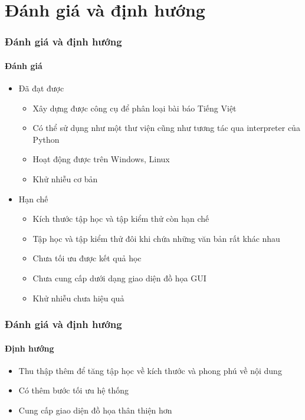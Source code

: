
\section{Đánh giá và định hướng}

\begin{frame}
  \frametitle{Đánh giá và định hướng}
  \framesubtitle{Đánh giá}
  \begin{itemize}[<+->]
    \item Đã đạt được
      \begin{itemize}
        \item Xây dựng được công cụ để phân loại bài báo Tiếng Việt
        \item Có thể sử dụng như một thư viện cũng như tương tác qua interpreter của Python
        \item Hoạt động được trên Windows, Linux
        \item Khử nhiễu cơ bản
      \end{itemize}
    \item Hạn chế
      \begin{itemize}
        \item Kích thước tập học và tập kiểm thử còn hạn chế
        \item Tập học và tập kiểm thử đôi khi chứa những văn bản rất khác nhau
        \item Chưa tối ưu được kết quả học
        \item Chưa cung cấp dưới dạng giao diện đồ họa GUI
        \item Khử nhiễu chưa hiệu quả
      \end{itemize}
  \end{itemize}
\end{frame}

\begin{frame}
  \frametitle{Đánh giá và định hướng}
  \framesubtitle{Định hướng}
  \begin{itemize}[<+->]
    \item Thu thập thêm để tăng tập học về kích thước và phong phú về nội dung
    \item Có thêm bước tối ưu hệ thống
    \item Cung cấp giao diện đồ họa thân thiện hơn
  \end{itemize}
\end{frame}
